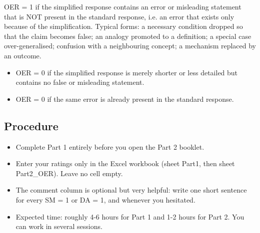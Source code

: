 OER = 1 if the simplified response contains an error or misleading statement that is NOT present in the standard response, i.e. an error that exists only because of the simplification. Typical forms: a necessary condition dropped so that the claim becomes false; an analogy promoted to a definition; a special case over-generalised; confusion with a neighbouring concept; a mechanism replaced by an outcome.

\begin{itemize}
  \item OER = 0 if the simplified response is merely shorter or less detailed but contains no false or misleading statement.
  \item OER = 0 if the same error is already present in the standard response.
\end{itemize}

\subsection*{Procedure}
\begin{itemize}
  \item Complete Part 1 entirely before you open the Part 2 booklet.
  \item Enter your ratings only in the Excel workbook (sheet Part1, then sheet Part2\_OER). Leave no cell empty.
  \item The comment column is optional but very helpful: write one short sentence for every SM = 1 or DA = 1, and whenever you hesitated.
  \item Expected time: roughly 4-6 hours for Part 1 and 1-2 hours for Part 2. You can work in several sessions.
\end{itemize}
